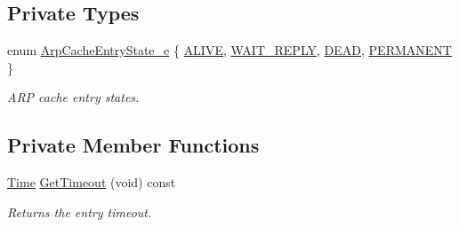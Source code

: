 \subsection*{Private Types}
\begin{DoxyCompactItemize}
\item 
enum \hyperlink{classns3_1_1ArpCache_1_1Entry_a95a2d5d357f7306cf73e9efe4758a2ea}{Arp\+Cache\+Entry\+State\+\_\+e} \{ \hyperlink{classns3_1_1ArpCache_1_1Entry_a95a2d5d357f7306cf73e9efe4758a2eaa7c6e5cb295147783a7233a7ba4e52c38}{A\+L\+I\+VE}, 
\hyperlink{classns3_1_1ArpCache_1_1Entry_a95a2d5d357f7306cf73e9efe4758a2eaa3a9eb00501370df59685623607504f39}{W\+A\+I\+T\+\_\+\+R\+E\+P\+LY}, 
\hyperlink{classns3_1_1ArpCache_1_1Entry_a95a2d5d357f7306cf73e9efe4758a2eaaccc31bc07150997f175ffe1f59edcbb1}{D\+E\+AD}, 
\hyperlink{classns3_1_1ArpCache_1_1Entry_a95a2d5d357f7306cf73e9efe4758a2eaa91293cdddaff5ef5edb16633c2226592}{P\+E\+R\+M\+A\+N\+E\+NT}
 \}\begin{DoxyCompactList}\small\item\em A\+RP cache entry states. \end{DoxyCompactList}
\end{DoxyCompactItemize}
\subsection*{Private Member Functions}
\begin{DoxyCompactItemize}
\item 
\hyperlink{classns3_1_1Time}{Time} \hyperlink{classns3_1_1ArpCache_1_1Entry_a3b74704d1b9a432cbb67f42186aae731}{Get\+Timeout} (void) const 
\begin{DoxyCompactList}\small\item\em Returns the entry timeout. \end{DoxyCompactList}\end{DoxyCompactItemize}
